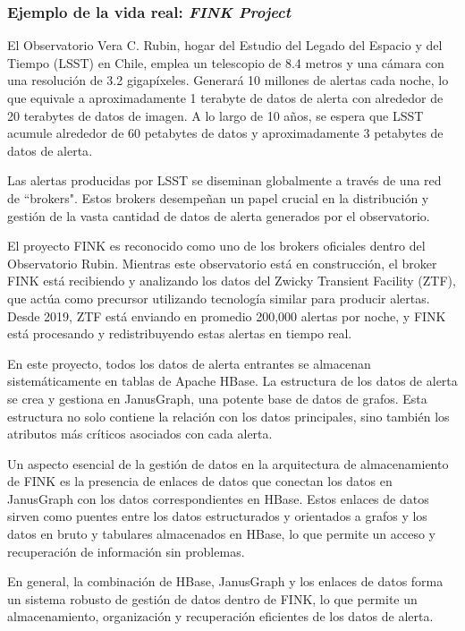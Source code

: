 \documentclass[pdflatex,sn-mathphys-num]{sn-jnl}
\theoremstyle{thmstyleone}%
\theoremstyle{thmstyletwo}%
\theoremstyle{thmstylethree}%
\begin{document}
\subsubsection{Ejemplo de la vida real: \textit{FINK Project}}

El Observatorio Vera C. Rubin, hogar del Estudio del Legado del Espacio y del Tiempo (LSST) en Chile, emplea un telescopio de 8.4 metros y una cámara con una resolución de 3.2 gigapíxeles. Generará 10 millones de alertas cada noche, lo que equivale a aproximadamente 1 terabyte de datos de alerta con alrededor de 20 terabytes de datos de imagen. A lo largo de 10 años, se espera que LSST acumule alrededor de 60 petabytes de datos y aproximadamente 3 petabytes de datos de alerta\cite{lsstsciencecollaboration2009lsst}.
    
Las alertas producidas por LSST se diseminan globalmente a través de una red de ``brokers". Estos brokers desempeñan un papel crucial en la distribución y gestión de la vasta cantidad de datos de alerta generados por el observatorio.

El proyecto FINK\cite{fink} es reconocido como uno de los brokers oficiales dentro del Observatorio Rubin. Mientras este observatorio está en construcción, el broker FINK está recibiendo y analizando los datos del Zwicky Transient Facility (ZTF)\cite{zwicky}, que actúa como precursor utilizando tecnología similar para producir alertas. Desde 2019, ZTF está enviando en promedio 200,000 alertas por noche, y FINK está procesando y redistribuyendo estas alertas en tiempo real.
    
En este proyecto, todos los datos de alerta entrantes se almacenan sistemáticamente en tablas de Apache HBase. La estructura de los datos de alerta se crea y gestiona en JanusGraph, una potente base de datos de grafos\cite{janusgraph}. Esta estructura no solo contiene la relación con los datos principales, sino también los atributos más críticos asociados con cada alerta.

Un aspecto esencial de la gestión de datos en la arquitectura de almacenamiento de FINK es la presencia de enlaces de datos que conectan los datos en JanusGraph con los datos correspondientes en HBase. Estos enlaces de datos sirven como puentes entre los datos estructurados y orientados a grafos y los datos en bruto y tabulares almacenados en HBase, lo que permite un acceso y recuperación de información sin problemas.

En general, la combinación de HBase, JanusGraph y los enlaces de datos forma un sistema robusto de gestión de datos dentro de FINK, lo que permite un almacenamiento, organización y recuperación eficientes de los datos de alerta.
\end{document}
